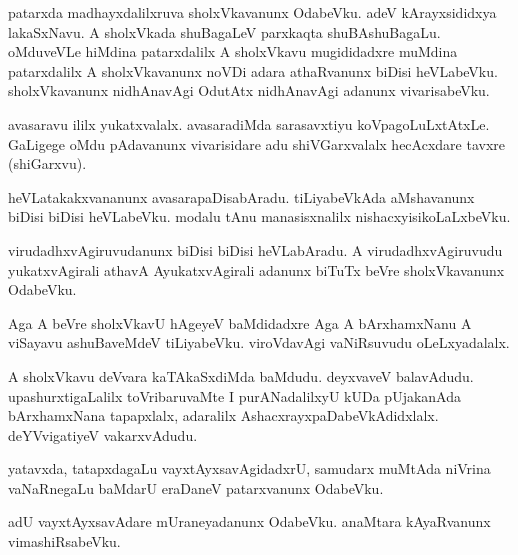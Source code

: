 \documentclass{article}
\begin{document}
\begin{mn}
patarxda madhayxdalilxruva  sholxVkavanunx  OdabeVku.  adeV  kArayxsididxya  lakaSxNavu.  A  sholxVkada  shuBagaLeV  parxkaqta  shuBAshuBagaLu.  
oMduveVLe  hiMdina  patarxdalilx  A  sholxVkavu  mugididadxre  muMdina  patarxdalilx  A  sholxVkavanunx  noVDi  adara  athaRvanunx  biDisi  heVLabeVku.  
sholxVkavanunx  nidhAnavAgi  OdutAtx  nidhAnavAgi  adanunx  vivarisabeVku.
\end{mn}

\begin{mn}
avasaravu  ililx  yukatxvalalx.  avasaradiMda  sarasavxtiyu  koVpagoLuLxtAtxLe.  GaLigege  oMdu  pAdavanunx  vivarisidare adu  
shiVGarxvalalx  hecAcxdare  tavxre  (shiGarxvu).
\end{mn}

\begin{mn}
heVLatakakxvananunx  avasarapaDisabAradu.  tiLiyabeVkAda  aMshavanunx  biDisi  biDisi  heVLabeVku.  modalu  tAnu  manasisxnalilx  nishacxyisikoLaLxbeVku.
\end{mn}

\begin{mn}
virudadhxvAgiruvudanunx  biDisi  biDisi  heVLabAradu.  A  virudadhxvAgiruvudu  yukatxvAgirali  athavA  AyukatxvAgirali  adanunx  biTuTx  beVre  sholxVkavanunx  OdabeVku.
\end{mn}

\begin{mn}
Aga  A  beVre  sholxVkavU  hAgeyeV  baMdidadxre  Aga  A  bArxhamxNanu  A  viSayavu  ashuBaveMdeV  tiLiyabeVku.  viroVdavAgi  vaNiRsuvudu  oLeLxyadalalx.
\end{mn}

\begin{mn}
A  sholxVkavu  deVvara  kaTAkaSxdiMda  baMdudu.  deyxvaveV  balavAdudu.  upashurxtigaLalilx  toVribaruvaMte  I  purANadalilxyU  kUDa  pUjakanAda  bArxhamxNana  
tapapxlalx,  adaralilx  AshacxrayxpaDabeVkAdidxlalx.  deYVvigatiyeV  vakarxvAdudu.
\end{mn}

\begin{mn}
yatavxda,  tatapxdagaLu  vayxtAyxsavAgidadxrU,  samudarx  muMtAda  niVrina  vaNaRnegaLu  baMdarU  eraDaneV  patarxvanunx   OdabeVku.
\end{mn}

\begin{mn}
adU  vayxtAyxsavAdare  mUraneyadanunx  OdabeVku.  anaMtara  kAyaRvanunx  vimashiRsabeVku.  
\end{mn}
\end{document}
